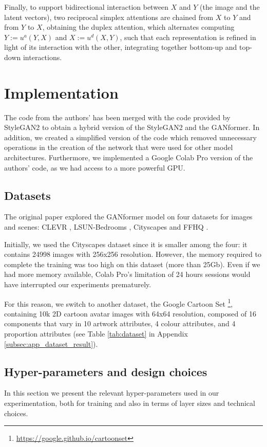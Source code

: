 \documentclass{article}
\begin{document}
	Finally, to support bidirectional interaction between $X$ and $Y$ (the image and the latent vectors), 
	two 
	reciprocal simplex attentions are chained from $X$ to $Y$ and from $Y$ to $X$, obtaining the 
	duplex 
	attention, which alternates computing $Y :=u^a(Y,X)$ and $X:=u^d(X,Y)$, such that each 
	representation is refined in light of its interaction with the other, integrating together bottom-up and 
	top-down interactions.
	
	\section{Implementation}
	The code from the authors' has been merged with the code provided by StyleGAN2 to obtain a 
	hybrid version of the
	StyleGAN2 and the GANformer. In addition, we created a simplified version of the code which 
	removed unnecessary
	operations in the creation of the network that were used for other model architectures. Furthermore, 
	we implemented a Google Colab Pro version of
	the authors’ code, as we had access to a more powerful GPU.
	
	\subsection{Datasets}	\label{sec:dataset}
	The original paper \cite{hudson2021generative} explored the GANformer model on four datasets for 
	images and scenes: CLEVR \cite{johnson2017clevr}, LSUN-Bedrooms \cite{yu2015lsun}, Cityscapes 
	\cite{cordts2016cityscapes} and FFHQ \cite{karras2019style}. 
	
	Initially, we used the Cityscapes dataset since it is smaller among the four: it contains 
	24998 images with 256x256 resolution. 
	However, the memory required to complete the training was too high on this dataset (more than 
	25Gb).
	Even if we had more memory available, Colab Pro's limitation of 24 hours sessions would have 
	interrupted our experiments prematurely.
	
	For this reason, we switch to another dataset, the Google Cartoon Set \cite{cartoonset}\footnote{	
		\url{https://google.github.io/cartoonset}}, containing 10k 2D cartoon avatar 
	images with 64x64 resolution, composed of 16 components that vary in 10 artwork attributes, 4 
	colour attributes, and 4 proportion attributes (see Table \ref{tab:dataset} in Appendix 
	\ref{subsec:app_dataset_result}). 
	
	\subsection{Hyper-parameters and design choices}\label{sec:hyperparam}
	In this section we present the relevant hyper-parameters used in our experimentation, both for 
	training and also in terms of layer sizes and technical choices.
	
\end{document}
